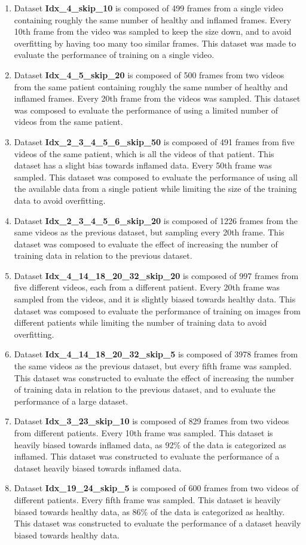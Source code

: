 \begin{enumerate}
	\item Dataset \textbf{Idx\_4\_skip\_10} is composed of 499 frames from a single video containing roughly the same number of healthy and inflamed frames. Every 10th frame from the video was sampled to keep the size down, and to avoid overfitting by having too many too similar frames. This dataset was made to evaluate the performance of training on a single video.
	\item Dataset \textbf{Idx\_4\_5\_skip\_20} is composed of 500 frames from two videos from the same patient containing roughly the same number of healthy and inflamed frames. Every 20th frame from the videos was sampled. This dataset was composed to evaluate the performance of using a limited number of videos from the same patient. 
	\item Dataset \textbf{Idx\_2\_3\_4\_5\_6\_skip\_50} is composed of 491 frames from five videos of the same patient, which is all the videos of that patient. This dataset has a slight bias towards inflamed data. Every 50th frame was sampled. This dataset was composed to evaluate the performance of using all the available data from a single patient while limiting the size of the training data to avoid overfitting. 
	\item Dataset \textbf{Idx\_2\_3\_4\_5\_6\_skip\_20} is composed of 1226 frames from the same videos as the previous dataset, but sampling every 20th frame. This dataset was composed to evaluate the effect of increasing the number of training data in relation to the previous dataset.
	\item Dataset \textbf{Idx\_4\_14\_18\_20\_32\_skip\_20} is composed of 997 frames from five different videos, each from a different patient. Every 20th frame was sampled from the videos, and it is slightly biased towards healthy data. This dataset was composed to evaluate the performance of training on images from different patients while limiting the number of training data to avoid overfitting.
	\item Dataset \textbf{Idx\_4\_14\_18\_20\_32\_skip\_5} is composed of 3978 frames from the same videos as the previous dataset, but every fifth frame was sampled. This dataset was constructed to evaluate the effect of increasing the number of training data in relation to the previous dataset, and to evaluate the performance of a large dataset.
	\item Dataset \textbf{Idx\_3\_23\_skip\_10} is composed of 829 frames from two videos from different patients. Every 10th frame was sampled. This dataset is heavily biased towards inflamed data, as 92\% of the data is categorized as inflamed. This dataset was constructed to evaluate the performance of a dataset heavily biased towards inflamed data.
	\item Dataset \textbf{Idx\_19\_24\_skip\_5} is composed of 600 frames from two videos of different patients. Every fifth frame was sampled. This dataset is heavily biased towards healthy data, as 86\% of the data is categorized as healthy. This dataset was constructed to evaluate the performance of a dataset heavily biased towards healthy data.
\end{enumerate}
